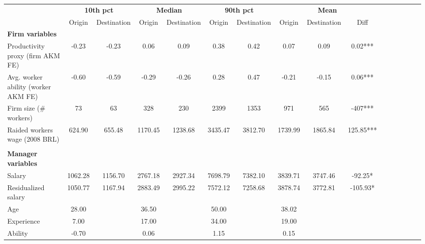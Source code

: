 {
\def\sym#1{\ifmmode^{#1}\else\(^{#1}\)\fi}
\begin{tabular}{l*{5}{ccc}}
\toprule
                    &\multicolumn{2}{c}{\textbf{10th pct}}&\multicolumn{2}{c}{\textbf{Median}}&\multicolumn{2}{c}{\textbf{90th pct}}&\multicolumn{3}{c}{\textbf{Mean}}        \\\cmidrule(lr){2-3}\cmidrule(lr){4-5}\cmidrule(lr){6-7}\cmidrule(lr){8-10}
                    &      Origin& Destination&      Origin& Destination&      Origin& Destination&      Origin& Destination&        Diff   \\
\midrule
\textbf{Firm variables}&            &            &            &            &            &            &            &            &               \\
Productivity proxy (firm AKM FE)&       -0.23&       -0.23&        0.06&        0.09&        0.38&        0.42&        0.07&        0.09&        0.02***\\
Avg. worker ability (worker AKM FE)&       -0.60&       -0.59&       -0.29&       -0.26&        0.28&        0.47&       -0.21&       -0.15&        0.06***\\
Firm size (\# workers)&          73&          63&         328&         230&        2399&        1353&         971&         565&        -407***\\
Raided workers wage (2008 BRL)&      624.90&      655.48&     1170.45&     1238.68&     3435.47&     3812.70&     1739.99&     1865.84&      125.85***\\
\\ \textbf{Manager variables}&            &            &            &            &            &            &            &            &               \\
Salary              &     1062.28&     1156.70&     2767.18&     2927.34&     7698.79&     7382.10&     3839.71&     3747.46&      -92.25*  \\
Residualized salary &     1050.77&     1167.94&     2883.49&     2995.22&     7572.12&     7258.68&     3878.74&     3772.81&     -105.93*  \\
Age                 &       28.00&            &       36.50&            &       50.00&            &       38.02&            &               \\
Experience          &        7.00&            &       17.00&            &       34.00&            &       19.00&            &               \\
Ability             &       -0.70&            &        0.06&            &        1.15&            &        0.15&            &               \\

\end{tabular}}
